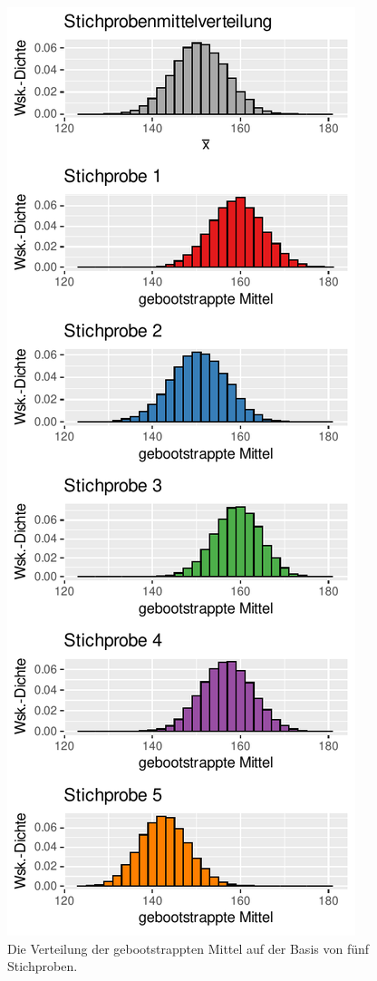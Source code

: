 \documentclass[oneside, 10pt]{book}\usepackage[]{graphicx}\usepackage[]{xcolor}
\newenvironment{knitrout}{}{} %
\begin{document}
\begin{knitrout}
\color{fgcolor}\begin{figure}[tp]

{\centering \includegraphics[width=.5\textwidth]{figs/unnamed-chunk-144-1} 

}

\caption{Die Verteilung der gebootstrappten Mittel auf der Basis von fünf Stichproben.\label{fig:bootstrapdistributions}}\label{fig:unnamed-chunk-144}
\end{figure}

\end{knitrout}
\end{document}
